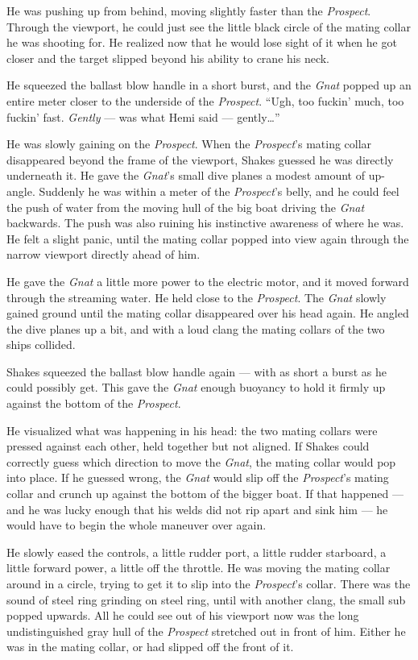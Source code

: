 \documentclass[
]{scrbook}
\begin{document}
He was pushing up from behind, moving slightly faster than the
\emph{Prospect}. Through the viewport, he could just see the little
black circle of the mating collar he was shooting for. He realized now
that he would lose sight of it when he got closer and the target slipped
beyond his ability to crane his neck.

He squeezed the ballast blow handle in a short burst, and the
\emph{Gnat} popped up an entire meter closer to the underside of the
\emph{Prospect}. ``Ugh, too fuckin' much, too fuckin' fast.
\emph{Gently} --- was what Hemi said --- gently\ldots{}''

He was slowly gaining on the \emph{Prospect}. When the \emph{Prospect}'s
mating collar disappeared beyond the frame of the viewport, Shakes
guessed he was directly underneath it. He gave the \emph{Gnat}'s small
dive planes a modest amount of up-angle. Suddenly he was within a meter
of the \emph{Prospect}'s belly, and he could feel the push of water from
the moving hull of the big boat driving the \emph{Gnat} backwards. The
push was also ruining his instinctive awareness of where he was. He felt
a slight panic, until the mating collar popped into view again through
the narrow viewport directly ahead of him.

He gave the \emph{Gnat} a little more power to the electric motor, and
it moved forward through the streaming water. He held close to the
\emph{Prospect}. The \emph{Gnat} slowly gained ground until the mating
collar disappeared over his head again. He angled the dive planes up a
bit, and with a loud clang the mating collars of the two ships collided.

Shakes squeezed the ballast blow handle again --- with as short a burst
as he could possibly get. This gave the \emph{Gnat} enough buoyancy to
hold it firmly up against the bottom of the \emph{Prospect}.

He visualized what was happening in his head: the two mating collars
were pressed against each other, held together but not aligned. If
Shakes could correctly guess which direction to move the \emph{Gnat},
the mating collar would pop into place. If he guessed wrong, the
\emph{Gnat} would slip off the \emph{Prospect}'s mating collar and
crunch up against the bottom of the bigger boat. If that happened ---
and he was lucky enough that his welds did not rip apart and sink him
--- he would have to begin the whole maneuver over again.

He slowly eased the controls, a little rudder port, a little rudder
starboard, a little forward power, a little off the throttle. He was
moving the mating collar around in a circle, trying to get it to slip
into the \emph{Prospect}'s collar. There was the sound of steel ring
grinding on steel ring, until with another clang, the small sub popped
upwards. All he could see out of his viewport now was the long
undistinguished gray hull of the \emph{Prospect} stretched out in front
of him. Either he was in the mating collar, or had slipped off the front
of it.
\end{document}
